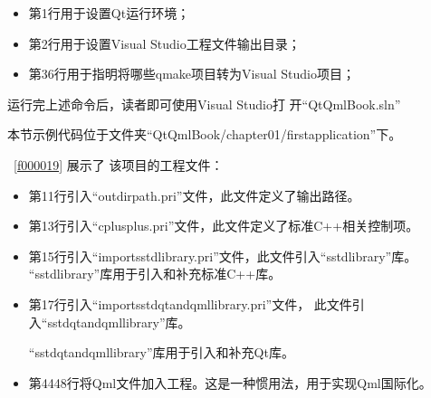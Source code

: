 \begin{itemize}

\item 第1行用于设置Qt运行环境；
\item 第2行用于设置Visual Studio工程文件输出目录；
\item 第3\raisebox{0.16ex}{\sourcefonttwo\~{}}6行用于指明将哪些qmake项目转为Visual Studio项目；

\end{itemize}

运行完上述命令后，读者即可使用Visual Studio打
开“QtQmlBook.sln”

本节示例代码位于文件夹“QtQmlBook/chapter01/firstapplication”下。

\lstlistingname\ \ref{f000019}
展示了
该项目的工程文件：

\begin{itemize}
\item 第11行引入“outdirpath.pri”文件，此文件定义了输出路径。
\item 第13行引入“cplusplus.pri”文件，此文件定义了标准C{\sourcefonttwo{}+}{\sourcefonttwo{}+}相关控制项。
\item 第15行引入“import\underline{\hspace{0.5em}}sstd\underline{\hspace{0.5em}}library.pri”文件，此文件引入“sstd\underline{\hspace{0.5em}}library”库。
“sstd\underline{\hspace{0.5em}}library”库用于引入和补充标准C{\sourcefonttwo{}+}{\sourcefonttwo{}+}库。
\item 第17行引入“import\underline{\hspace{0.5em}}sstd\underline{\hspace{0.5em}}qt\underline{\hspace{0.5em}}and\underline{\hspace{0.5em}}qml\underline{\hspace{0.5em}}library.pri”文件，
此文件引入“sstd\underline{\hspace{0.5em}}\-qt\underline{\hspace{0.5em}}\-and\underline{\hspace{0.5em}}\-qml\underline{\hspace{0.5em}}\-library”库。

“sstd\underline{\hspace{0.5em}}qt\underline{\hspace{0.5em}}and\underline{\hspace{0.5em}}qml\underline{\hspace{0.5em}}library”库用于引入和补充Qt库。
\item 第44\raisebox{0.16ex}{\sourcefonttwo\~{}}48行将Qml文件加入工程。这是一种惯用法，用于实现Qml国际化。
\end{itemize}

